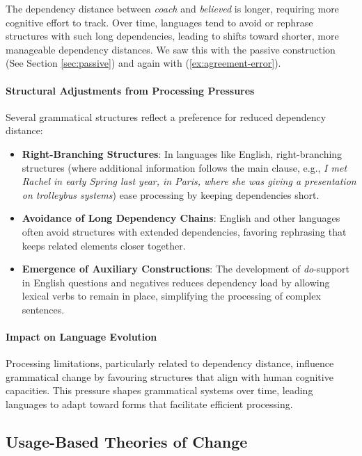 The dependency distance between \textit{coach} and \textit{believed} is longer, requiring more cognitive effort to track. Over time, languages tend to avoid or rephrase structures with such long dependencies, leading to shifts toward shorter, more manageable dependency distances. We saw this with the passive construction (See Section \ref{sec:passive}) and again with (\ref{ex:agreement-error}).

\paragraph*{Structural Adjustments from Processing Pressures}

Several grammatical structures reflect a preference for reduced dependency distance:
\begin{itemize}[noitemsep]
    \item \textbf{Right-Branching Structures}: In languages like English, right-branching structures (where additional information follows the main clause, e.g., \textit{I met Rachel in early Spring last year, in Paris, where she was giving a presentation on trolleybus systems}) ease processing by keeping dependencies short.
    
    \item \textbf{Avoidance of Long Dependency Chains}: English and other languages often avoid structures with extended dependencies, favoring rephrasing that keeps related elements closer together.
    
    \item \textbf{Emergence of Auxiliary Constructions}: The development of \textit{do}-support in English questions and negatives reduces dependency load by allowing lexical verbs to remain in place, simplifying the processing of complex sentences.
\end{itemize}

\paragraph*{Impact on Language Evolution}

Processing limitations, particularly related to dependency distance, influence grammatical change by favouring structures that align with human cognitive capacities. This pressure shapes grammatical systems over time, leading languages to adapt toward forms that facilitate efficient processing.

\subsection{Usage-Based Theories of Change}

